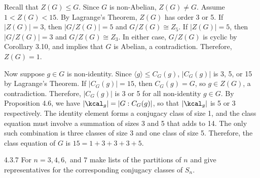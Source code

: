 \begin{sol}[spsol]
	Recall that $Z(G) \leq G$.
	Since $G$ is non-Abelian, $Z(G) \neq G$.
	Assume $1 < Z(G) < 15$.
	By Lagrange's Theorem, $Z(G)$ has order 3 or 5.
	If $|Z(G)| = 3$, then $|G/Z(G)| = 5$ and $G/Z(G) \cong Z_5$.
	If $|Z(G)| = 5$, then $|G/Z(G)| = 3$ and $G/Z(G) \cong Z_3$.
	In either case, $G/Z(G)$ is cyclic by Corollary 3.10, and  implies that $G$ is Abelian, a contradiction.
	Therefore, $Z(G) = 1$.

	Now suppose $g \in G$ is non-identity.
	Since $\langle g \rangle \leq C_G(g)$, $|C_G(g)|$ is 3, 5, or 15 by Lagrange's Theorem.
	If $|C_G(g)| = 15$, then $C_G(g) = G$, so $g \in Z(G)$, a contradiction.
	Therefore, $|C_G(g)|$ is 3 or 5 for all non-identity $g \in G$.
	By Proposition 4.6, we have $|\kcal_g| = |G : C_G(g)|$, so that $|\kcal_g|$ is 5 or 3 respectively.
	The identity element forms a conjugacy class of size 1, and the class equation must involve a summation of sizes 3 and 5 that adds to 14.
	The only such combination is three classes of size 3 and one class of size 5.
	Therefore, the class equation of $G$ is $15 = 1 + 3 + 3 + 3 + 5$.
\end{sol}

\begin{exercise}{4.3.7}
	For $n=3,4,6,$ and $7$ make lists of the partitions of $n$ and give representatives for the corresponding conjugacy classes of $S_n$.
\end{exercise}

